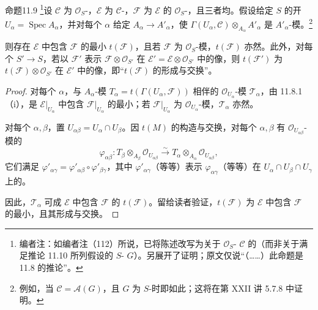 \begin{SGAresult}{命题}{11.9}
\footnote{编者注：如编者注（112）所说，已将陈述改写为关于 $\mathcal O_S$- $\mathcal C$ 的（而非关于满足推论 11.10 所列假设的 $S$- $G$）。另展开了证明；原文仅说“（……）此命题是 11.8 的推论”。}设 $\mathcal C$ 为 $\mathcal O_S$-，$\mathcal E$ 为 $\mathcal C$-，$\mathcal F$ 为 $\mathcal E$ 的 $\mathcal O_S$-，且三者均。假设给定 $S$ 的开 $U_\alpha=\operatorname{Spec}A_\alpha$，并对每个 $\alpha$ 给定 $A_\alpha\to A'_\alpha$，使 $\Gamma(U_\alpha,\mathcal C)\otimes_{A_\alpha}A'_\alpha$ 是 $A'_\alpha$-模。\footnote{例如，当 $\mathcal C=\mathcal A(G)$，且 $G$ 为 $S$-时即如此；这将在第 XXII 讲 5.7.8 中证明。}

则存在 $\mathcal E$ 中包含 $\mathcal F$ 的最小 $t(\mathcal F)$，且若 $\mathcal F$ 为 $\mathcal O_S$-模，$t(\mathcal F)$ 亦然。此外，对每个 $S'\to S$，若以 $\mathcal F'$ 表示 $\mathcal F\otimes\mathcal O_{S'}$ 在 $\mathcal E'=\mathcal E\otimes\mathcal O_{S'}$ 中的像，则 $t(\mathcal F')$ 为 $t(\mathcal F)\otimes\mathcal O_{S'}$ 在 $\mathcal E'$ 中的像，即“$t(\mathcal F)$ 的形成与交换”。
\end{SGAresult}
\begin{proof}
对每个 $\alpha$，与 $A_\alpha$-模 $T_\alpha=t(\Gamma(U_\alpha,\mathcal F))$ 相伴的 $\mathcal O_{U_\alpha}$-模 $\mathcal T_\alpha$，由 11.8.1（i），是 $\mathcal E|_{U_\alpha}$ 中包含 $\mathcal F|_{U_\alpha}$ 的最小；若 $\mathcal F|_{U_\alpha}$ 为 $\mathcal O_{U_\alpha}$-模，$\mathcal T_\alpha$ 亦然。

对每个 $\alpha,\beta$，置 $U_{\alpha\beta}=U_\alpha\cap U_\beta$。因 $t(M)$ 的构造与交换，对每个 $\alpha,\beta$ 有 $\mathcal O_{U_{\alpha\beta}}$-模的
\[
\varphi_{\alpha\beta}:T_\beta\otimes_{A_\beta}\mathcal O_{U_{\alpha\beta}}
\xrightarrow{\sim}T_\alpha\otimes_{A_\alpha}\mathcal O_{U_{\alpha\beta}},
\]
它们满足 $\varphi'_{\alpha\gamma}=\varphi'_{\alpha\beta}\circ\varphi'_{\beta\gamma}$，其中 $\varphi'_{\alpha\gamma}$（等等）表示 $\varphi_{\alpha\gamma}$（等等）在 $U_\alpha\cap U_\beta\cap U_\gamma$ 上的。

因此，$\mathcal T_\alpha$ 可成 $\mathcal E$ 中包含 $\mathcal F$ 的 $t(\mathcal F)$。留给读者验证，$t(\mathcal F)$ 为 $\mathcal E$ 中包含 $\mathcal F$ 的最小，且其形成与交换。
\end{proof}

